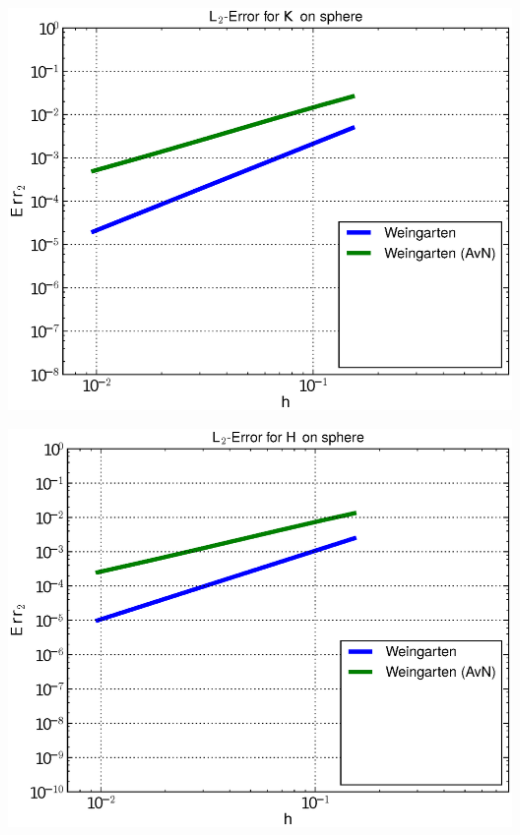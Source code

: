 \documentclass{beamer}
\begin{document}
\begin{frame}
\begin{overprint}
\begin{minipage}[t]{0.49\textwidth}
          \end{minipage}
          \begin{minipage}[t]{0.49\textwidth}
            \centering\includegraphics[width=\textwidth]{bilder/Curvature/sphere/ErrKL2_2.eps}
          \end{minipage}\hfill
          \begin{minipage}[t]{0.49\textwidth}
            \centering\includegraphics[width=\textwidth]{bilder/Curvature/sphere/ErrHL2_2.eps}
          \end{minipage}
          \begin{minipage}[t]{0.49\textwidth}

\end{minipage}
\end{overprint}
\end{frame}
\end{document}
